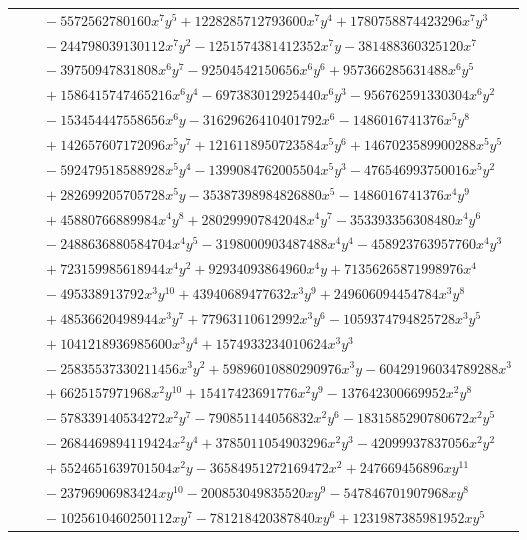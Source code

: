 \documentclass[11pt]{article}
\begin{document}
\begin{longtable}{@{}ll@{}}
 & $\quad -5572562780160x^{7}y^{5}+1228285712793600x^{7}y^{4}+1780758874423296x^{7}y^{3}$\\
 & $\quad -244798039130112x^{7}y^{2}-1251574381412352x^{7}y-381488360325120x^{7}$\\
 & $\quad -39750947831808x^{6}y^{7}-92504542150656x^{6}y^{6}+957366285631488x^{6}y^{5}$\\
 & $\quad +1586415747465216x^{6}y^{4}-697383012925440x^{6}y^{3}-956762591330304x^{6}y^{2}$\\
 & $\quad -153454447558656x^{6}y-31629626410401792x^{6}-1486016741376x^{5}y^{8}$\\
 & $\quad +142657607172096x^{5}y^{7}+1216118950723584x^{5}y^{6}+1467023589900288x^{5}y^{5}$\\
 & $\quad -592479518588928x^{5}y^{4}-1399084762005504x^{5}y^{3}-476546993750016x^{5}y^{2}$\\
 & $\quad +282699205705728x^{5}y-35387398984826880x^{5}-1486016741376x^{4}y^{9}$\\
 & $\quad +45880766889984x^{4}y^{8}+280299907842048x^{4}y^{7}-353393356308480x^{4}y^{6}$\\
 & $\quad -2488636880584704x^{4}y^{5}-3198000903487488x^{4}y^{4}-458923763957760x^{4}y^{3}$\\
 & $\quad +723159985618944x^{4}y^{2}+92934093864960x^{4}y+71356265871998976x^{4}$\\
 & $\quad -495338913792x^{3}y^{10}+43940689477632x^{3}y^{9}+249606094454784x^{3}y^{8}$\\
 & $\quad +48536620498944x^{3}y^{7}+77963110612992x^{3}y^{6}-1059374794825728x^{3}y^{5}$\\
 & $\quad +1041218936985600x^{3}y^{4}+1574933234010624x^{3}y^{3}$\\
 & $\quad -25835537330211456x^{3}y^{2}+59896010880290976x^{3}y-60429196034789288x^{3}$\\
 & $\quad +6625157971968x^{2}y^{10}+15417423691776x^{2}y^{9}-137642300669952x^{2}y^{8}$\\
 & $\quad -578339140534272x^{2}y^{7}-790851144056832x^{2}y^{6}-1831585290780672x^{2}y^{5}$\\
 & $\quad -2684469894119424x^{2}y^{4}+3785011054903296x^{2}y^{3}-42099937837056x^{2}y^{2}$\\
 & $\quad +5524651639701504x^{2}y-36584951272169472x^{2}+247669456896xy^{11}$\\
 & $\quad -23796906983424xy^{10}-200853049835520xy^{9}-547846701907968xy^{8}$\\
 & $\quad -1025610460250112xy^{7}-781218420387840xy^{6}+1231987385981952xy^{5}$\\

\end{longtable}
\end{document}

